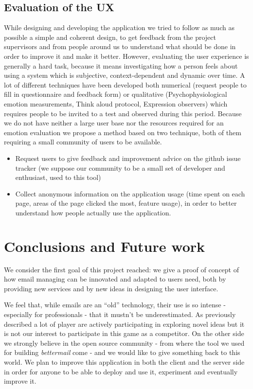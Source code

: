 \documentclass[a4paper,12pt]{report}
\begin{document}

\section{Evaluation of the UX}
While designing and developing the application we tried to follow as much as possible a simple and coherent design, to get feedback from the project supervisors and from people around us to understand what should be done in order to improve it and make it better.
However, evaluating the user experience is generally a hard task, because it means investigating how a person feels about using a system which is subjective, context-dependent and dynamic over time.
A lot of different techniques have been developed both numerical (request people to fill in questionnaire and feedback form) or qualitative (Psychophysiological emotion measurements, Think aloud protocol, Expression observers) which requires people to be invited to a test and observed during this period.
Because we do not have neither a large user base nor the resources required for an emotion evaluation we propose a method based on two technique, both of them requiring a small community of users to be available.
\begin{itemize}
  \item Request users to give feedback and improvement advice on the github issue tracker (we suppose our community to be a small set of developer and enthusiast, used to this tool)
  \item Collect anonymous information on the application usage (time spent on each page, areas of the page clicked the most, feature usage), in order to better understand how people actually use the application.
\end{itemize}

\chapter{Conclusions and Future work}
We consider the first goal of this project reached: we give a proof of concept of how email managing can be innovated and adapted to users need, both by providing new services and by new ideas in designing the user interface.

We feel that, while emails are an ``old'' technology, their use is so intense - especially for professionals - that it mustn't be underestimated. As previously described a lot of player are actively participating in exploring novel ideas but it is not our interest to participate in this game as a competitor. 
On the other side we strongly believe in the open source community - from where the tool we used for building \emph{bettermail} come - and we would like to give something back to this world. We plan to improve this application in both the client and the server side in order for anyone to be able to deploy and use it, experiment and eventually improve it.
\end{document}
